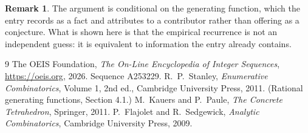 \documentclass[11pt,a4paper]{article}
\theoremstyle{plain}
\theoremstyle{definition}
\newtheorem{remark}[theorem]{Remark}
\begin{document}
\begin{remark}
The argument is conditional on the generating function, which the entry records as a fact and
attributes to a contributor rather than offering as a conjecture. What is shown here is that
the empirical recurrence is not an independent guess: it is equivalent to information the
entry already contains.
\end{remark}

\begin{thebibliography}{9}
 The OEIS Foundation, \emph{The On-Line Encyclopedia of Integer
Sequences}, \url{https://oeis.org}, 2026. Sequence A253229.
 R.~P.~Stanley, \emph{Enumerative Combinatorics}, Volume 1, 2nd ed.,
Cambridge University Press, 2011. (Rational generating functions, Section 4.1.)
 M.~Kauers and P.~Paule, \emph{The Concrete Tetrahedron}, Springer, 2011.
 P.~Flajolet and R.~Sedgewick, \emph{Analytic Combinatorics}, Cambridge
University Press, 2009.
\end{thebibliography}
\end{document}
